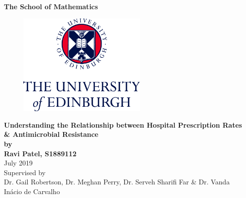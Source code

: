 \documentclass[11pt,twoside]{article}
\numberwithin{Theorem}{section}
\numberwithin{Definition}{section}
\numberwithin{Lemma}{section}
\numberwithin{Algorithm}{section}
\numberwithin{equation}{section}
\begin{document}
\setlength{\abovedisplayskip}{-10pt}
\setlength{\belowdisplayskip}{2pt}
\setlength{\abovedisplayshortskip}{-5pt}
\setlength{\belowdisplayshortskip}{5pt}



\pagestyle{empty}

\begin{titlepage}
	\vspace*{.5em}
	\center
	\textbf{\large{The School of Mathematics}} \\
	\vspace*{1em}
	\begin{figure}[!h]
		\centering
		\includegraphics[width=180pt]{Template/CentredLogoCMYK.jpg}
	\end{figure}
	\vspace{2em}
	\textbf{\Huge{Understanding the Relationship between Hospital Prescription Rates \& Antimicrobial Resistance}}\\[2em]
	\textbf{\LARGE{by}}\\
	\vspace{2em}
	\textbf{\LARGE{Ravi Patel, S1889112}}\\
	\vspace{6.5em}
	\vspace{6.5em}
	\Large{July 2019}\\
	\vspace{3em}
	\normalsize{Supervised by\\ Dr. Gail Robertson, Dr. Meghan Perry, Dr. Serveh Sharifi Far \& Dr. Vanda In{\'a}cio de Carvalho}
	\vfill
\end{titlepage}

\clearpage

\end{document}
